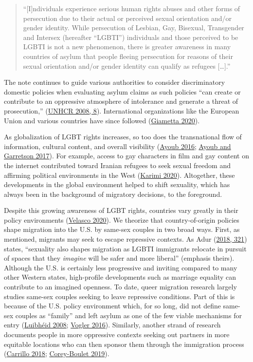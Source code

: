 \documentclass[
  11pt,
]{article}
\begin{document}
\begin{quote}
``{[}I{]}ndividuals experience serious human rights abuses and other forms of persecution due to their actual or perceived sexual orientation and/or gender identity. While persecution of Lesbian, Gay, Bisexual, Transgender and Intersex (hereafter ``LGBTI'') individuals and those perceived to be LGBTI is not a new phenomenon, there is greater awareness in many countries of asylum that people fleeing persecution for reasons of their sexual orientation and/or gender identity can qualify as refugees {[}\ldots{]}.''
\end{quote}

The note continues to guide various authorities to consider discriminatory domestic policies when evaluating asylum claims as such policies ``can create or contribute to an oppressive atmosphere of intolerance and generate a threat of prosecution,'' (\protect\hyperlink{ref-unhcr_2008}{UNHCR 2008, 8}). International organizations like the European Union and various countries have since followed (\protect\hyperlink{ref-giametta_2020}{Giametta 2020}).

As globalization of LGBT rights increases, so too does the transnational flow of information, cultural content, and overall visibility (\protect\hyperlink{ref-ayoub_2016}{Ayoub 2016}; \protect\hyperlink{ref-ayoub_2017}{Ayoub and Garretson 2017}). For example, access to gay characters in film and gay content on the internet contributed toward Iranian refugees to seek sexual freedom and affirming political environments in the West (\protect\hyperlink{ref-karimi_2020}{Karimi 2020}). Altogether, these developments in the global environment helped to shift sexuality, which has always been in the background of migratory decisions, to the foreground.

Despite this growing awareness of LGBT rights, countries vary greatly in their policy environments (\protect\hyperlink{ref-velasco_2020}{Velasco 2020}). We theorize that country-of-origin policies shape migration into the U.S. by same-sex couples in two broad ways. First, as mentioned, migrants may seek to escape repressive contexts. As Adur (\protect\hyperlink{ref-adur_2018}{2018, 321}) states, ``sexuality also shapes migration as LGBTI immigrants relocate in pursuit of spaces that they \emph{imagine} will be safer and more liberal'' (emphasis theirs). Although the U.S. is certainly less progressive and inviting compared to many other Western states, high-profile developments such as marriage equality can contribute to an imagined openness. To date, queer migration research largely studies same-sex couples seeking to leave repressive conditions. Part of this is because of the U.S. policy environment which, for so long, did not define same-sex couples as ``family'' and left asylum as one of the few viable mechanisms for entry (\protect\hyperlink{ref-luibheid_2008}{Luibhéid 2008}; \protect\hyperlink{ref-vogler_2016}{Vogler 2016}). Similarly, another strand of research documents people in more oppressive contexts seeking out partners in more equitable locations who can then sponsor them through the immigration process (\protect\hyperlink{ref-carrillo_2018}{Carrillo 2018}; \protect\hyperlink{ref-corey-boulet_2019}{Corey-Boulet 2019}).
\end{document}

